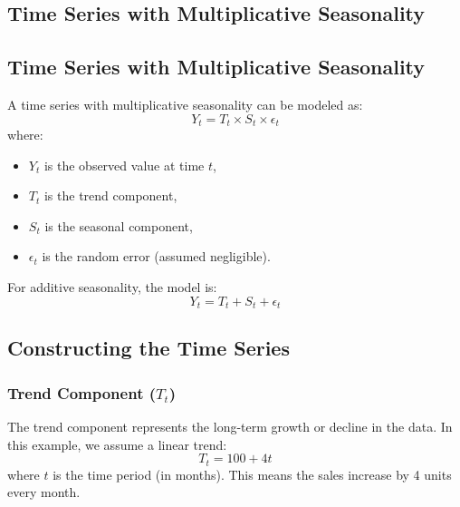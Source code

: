 \begin{notechapter}
\lstset{style=mystyle}
\chapter{Time Series with Multiplicative Seasonality}\label{ch:multiplicative-seasonality}

\section{Time Series with Multiplicative Seasonality}

A time series with multiplicative seasonality can be modeled as:
\[
Y_t = T_t \times S_t \times \epsilon_t
\]
where:
\begin{itemize}
    \item \( Y_t \) is the observed value at time \( t \),
    \item \( T_t \) is the trend component,
    \item \( S_t \) is the seasonal component,
    \item \( \epsilon_t \) is the random error (assumed negligible).
\end{itemize}

For additive seasonality, the model is:
\[
Y_t = T_t + S_t + \epsilon_t
\]

\section{Constructing the Time Series}

\subsection{Trend Component (\( T_t \))}
The trend component represents the long-term growth or decline in the data.
In this example, we assume a linear trend:
\[
T_t = 100 + 4t
\]
where \( t \) is the time period (in months).
This means the sales increase by 4 units every month.


\end{notechapter}
